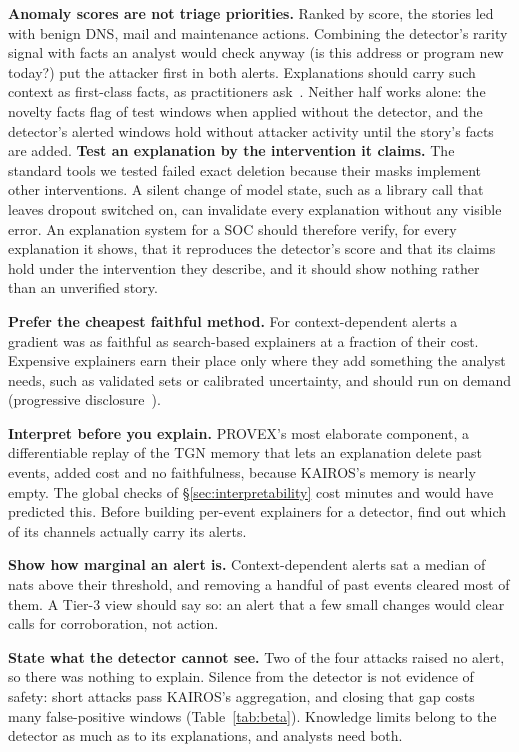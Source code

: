 \documentclass[conference]{IEEEtran}
\begin{document}
\textbf{Anomaly scores are not triage priorities.} Ranked by score, the stories led with benign DNS,
mail and maintenance actions. Combining the detector's rarity signal with facts an analyst would check
anyway (is this address or program new today?) put the attacker first in both alerts. Explanations
should carry such context as first-class facts, as practitioners ask~\cite{alahmadi,mink}.
Neither half works alone: the novelty facts flag \CtlNoveltyAllFlagged{} of \CtlTestWindows{} test windows
when applied without the detector, and the detector's \CtlKairosFlagged{} alerted windows hold
\CtlKairosFP{} without attacker activity until the story's facts are added.
\textbf{Test an explanation by the intervention it claims.} The standard tools we tested failed exact
deletion because their masks implement other interventions. A silent change of model state, such as a
library call that leaves dropout switched on, can invalidate every explanation without any visible error.
An explanation system for a SOC should therefore verify, for every explanation it shows, that it reproduces
the detector's score and that its claims hold under the intervention they describe, and it should show
nothing rather than an unverified story.

\textbf{Prefer the cheapest faithful method.} For context-dependent alerts a gradient was as faithful as
search-based explainers at a fraction of their cost. Expensive explainers earn their place only where they
add something the analyst needs, such as validated sets or calibrated uncertainty, and should run on
demand (progressive disclosure~\cite{tmt}).

\textbf{Interpret before you explain.} PROVEX's most elaborate component, a differentiable replay of the
TGN memory that lets an explanation delete past events, added cost and no faithfulness, because KAIROS's
memory is nearly empty. The global checks of \S\ref{sec:interpretability} cost minutes and would have
predicted this. Before building per-event explainers for a detector, find out which of its channels
actually carry its alerts.

\textbf{Show how marginal an alert is.} Context-dependent alerts sat a median of \HAWinMargin{} nats
above their threshold, and removing a handful of past events cleared most of them. A Tier-3 view should
say so: an alert that a few small changes would clear calls for corroboration, not action.

\textbf{State what the detector cannot see.} Two of the four attacks raised no alert, so there was
nothing to explain. Silence from the detector is not evidence of safety: short attacks pass KAIROS's
aggregation, and closing that gap costs many false-positive windows (Table~\ref{tab:beta}). Knowledge
limits belong to the detector as much as to its explanations, and analysts need both.
\end{document}
